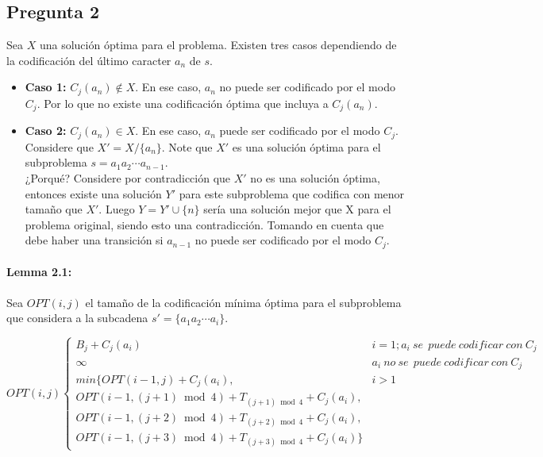 \subsection{Pregunta 2}

Sea $X$ una solución óptima para el problema. Existen tres casos dependiendo de la codificación 
del último caracter $a_n$ de $s$.

\begin{itemize}
    \item \textbf{Caso 1:} $C_j(a_n) \not\in X$. 
    En ese caso, $a_n$ no puede ser codificado por el modo $C_j$. Por lo que no existe una 
    codificación óptima que incluya a $C_j(a_n)$.  
    \item \textbf{Caso 2:} $C_j(a_n) \in X$.
    En ese caso, $a_n$ puede ser codificado por el modo $C_j$. Considere que $X' = X / \{a_n\}$.
    Note que $X'$ es una solución óptima para el subproblema $s={a_1a_2\cdots a_{n-1}}$. 
    \\¿Porqué? Considere por contradicción que $X'$ no es una solución óptima, entonces existe una 
    solución $Y'$ para este subproblema que codifica con menor tamaño que $X'$. Luego 
    $Y = Y' \cup \{n\}$ sería una solución mejor que X para el problema original, siendo esto
    una contradicción. Tomando en cuenta que debe haber una transición si $a_{n-1}$ no puede ser 
    codificado por el modo $C_j$.
\end{itemize}

\paragraph{Lemma 2.1:}
Sea $OPT(i, j)$ el tamaño de la codificación mínima óptima para el subproblema que considera a 
la subcadena $s'=\{a_1a_2 \cdots a_{i}\}$.

\[ OPT(i, j) \begin{cases} 
    B_j + C_j(a_i) & i = 1; a_i \: se\: \: puede\: codificar\: con\: C_j \\
    \infty & a_i \: no \: se\: \: puede\: codificar\: con\: C_j \\
    min\{OPT(i - 1, j) + C_j(a_i), & i > 1\\
    OPT(i - 1, (j+1) \bmod{4}) + T_{(j+1) \bmod{4}} + C_j(a_i), \\
    OPT(i - 1, (j+2) \bmod{4}) + T_{(j+2) \bmod{4}} +C_j(a_i), \\ 
    OPT(i - 1, (j+3) \bmod{4}) + T_{(j+3) \bmod{4}} + C_j(a_i)\}
 \end{cases}
\]


